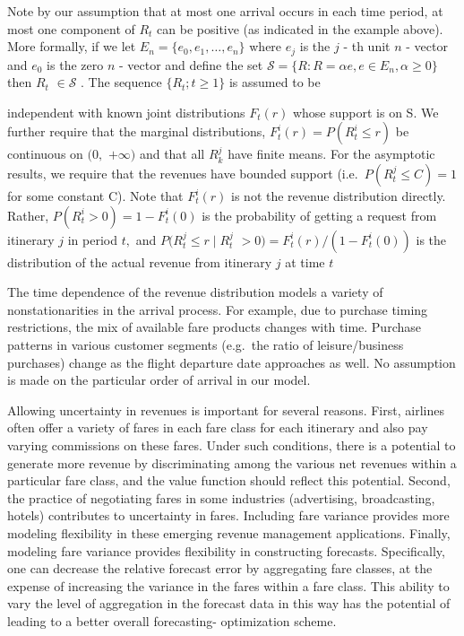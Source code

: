Note by our assumption that at most one arrival occurs in each time
period, at most one component of \(R_{t}\) can be positive (as indicated
in the example above). More formally, if we let
\(E_{n} = \{e_{0},e_{1},\ldots ,e_{n}\}\) where \(e_{j}\) is the \(j\) -
th unit \(n\) - vector and \(e_{0}\) is the zero \(n\) - vector and
define the set
\(\mathcal{S} = \{R:R = \alpha e,e\in E_{n},\alpha \geq 0\}\) then
\(R_{t}\) \(\in \mathcal{S}\) . The sequence \(\{R_{t};t\geq 1\}\) is
assumed to be

independent with known joint distributions \(F_{t}(r)\) whose support is
on S. We further require that the marginal distributions,
\(F_{t}^{i}(r) = P(R_{t}^{i}\leq r)\) be continuous on \((0,\)
\(+\infty)\) and that all \(R_{k}^{j}\) have finite means. For the
asymptotic results, we require that the revenues have bounded support
(i.e.~\(P(R_{t}^{j}\leq C) = 1\) for some constant C). Note that
\(F_{t}^{i}(r)\) is not the revenue distribution directly. Rather,
\(P(R_{t}^{i} > 0) = 1 - F_{t}^{i}(0)\) is the probability of getting a
request from itinerary \(j\) in period \(t,\) and
\(P(R_{t}^{j}\leq r\mid R_{t}^{j}\)
\(>0) = F_{t}^{i}(r) / (1 - F_{t}^{i}(0))\) is the distribution of the
actual revenue from itinerary \(j\) at time \(t\)

The time dependence of the revenue distribution models a variety of
nonstationarities in the arrival process. For example, due to purchase
timing restrictions, the mix of available fare products changes with
time. Purchase patterns in various customer segments (e.g.~the ratio of
leisure/business purchases) change as the flight departure date
approaches as well. No assumption is made on the particular order of
arrival in our model.

Allowing uncertainty in revenues is important for several reasons.
First, airlines often offer a variety of fares in each fare class for
each itinerary and also pay varying commissions on these fares. Under
such conditions, there is a potential to generate more revenue by
discriminating among the various net revenues within a particular fare
class, and the value function should reflect this potential. Second, the
practice of negotiating fares in some industries (advertising,
broadcasting, hotels) contributes to uncertainty in fares. Including
fare variance provides more modeling flexibility in these emerging
revenue management applications. Finally, modeling fare variance
provides flexibility in constructing forecasts. Specifically, one can
decrease the relative forecast error by aggregating fare classes, at the
expense of increasing the variance in the fares within a fare class.
This ability to vary the level of aggregation in the forecast data in
this way has the potential of leading to a better overall forecasting-
optimization scheme.

